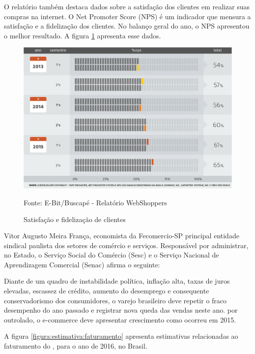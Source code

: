 \documentclass[a4paper,12pt]{monografia}
\begin{document}
O relatório também destaca dados sobre a satisfação dos clientes em realizar suas compras na internet. O Net Promoter Score (NPS) é um indicador que mensura a satisfação e a fidelização dos clientes. No balanço geral do ano, o NPS apresentou o melhor resultado. A figura \ref{figura:nps} apresenta esse dados.

\begin{figure}[H]
\centering
\includegraphics[width=12cm]{img/webshoppers/nps.eps}
\caption{Satisfação e fidelização de clientes}
\small{Fonte: E-Bit/Buscapé - Relatório WebShoppers}
\label{figura:nps}
\end{figure}

Vitor Augusto Meira França, economista da Fecomercio-SP principal entidade sindical paulista dos setores de comércio e serviços. Responsável por administrar, no Estado, o Serviço Social do Comércio (Sesc) e o Serviço Nacional de Aprendizagem Comercial (Senac) afirma o seguinte:

\begin{citacao}
Diante de um quadro de instabilidade política, inflação alta, taxas de juros elevadas, escassez de crédito, aumento do desemprego e consequente conservadorismo dos consumidores, o varejo brasileiro deve repetir o fraco desempenho do ano passado e registrar nova queda das vendas neste ano. por outrolado, o e-commerce deve apresentar crescimento como ocorreu em 2015. \cite{webshoppers}
\end{citacao}

A figura \ref{figura:estimativa:faturamento} apresenta estimativas relacionadas ao faturamento do , para o ano de 2016, no Brasil.
\end{document}
